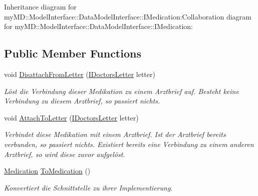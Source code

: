 Inheritance diagram for my\-MD::Model\-Interface::Data\-Model\-Interface::IMedication:Collaboration diagram for my\-MD::Model\-Interface::Data\-Model\-Interface::IMedication:\subsection*{Public Member Functions}
\begin{CompactItemize}
\item 
void \hyperlink{interfacemy_m_d_1_1_model_interface_1_1_data_model_interface_1_1_i_medication_d1ca6f76b75fe87eac94cbac8bc61322}{Disattach\-From\-Letter} (\hyperlink{interfacemy_m_d_1_1_model_interface_1_1_data_model_interface_1_1_i_doctors_letter}{IDoctors\-Letter} letter)
\begin{CompactList}\small\item\em L\"{o}st die Verbindung dieser Medikation zu einem Arztbrief auf. Besteht keine Verbindung zu diesem Arztbrief, so passiert nichts. \item\end{CompactList}\item 
void \hyperlink{interfacemy_m_d_1_1_model_interface_1_1_data_model_interface_1_1_i_medication_4e9eb33eb2d50445faed1fb21b100083}{Attach\-To\-Letter} (\hyperlink{interfacemy_m_d_1_1_model_interface_1_1_data_model_interface_1_1_i_doctors_letter}{IDoctors\-Letter} letter)
\begin{CompactList}\small\item\em Verbindet diese Medikation mit einem Arztbrief. Ist der Arztbrief bereits verbunden, so passiert nichts. Existiert bereits eine Verbindung zu einem anderen Arztbrief, so wird diese zuvor aufgel\"{o}st. \item\end{CompactList}\item 
\hyperlink{classmy_m_d_1_1_model_1_1_data_model_1_1_medication}{Medication} \hyperlink{interfacemy_m_d_1_1_model_interface_1_1_data_model_interface_1_1_i_medication_be8159bf4c393a1da18275bd4dfa8e4a}{To\-Medication} ()
\begin{CompactList}\small\item\em Konvertiert die Schnittstelle zu ihrer Implementierung. \item\end{CompactList}\end{CompactItemize}

